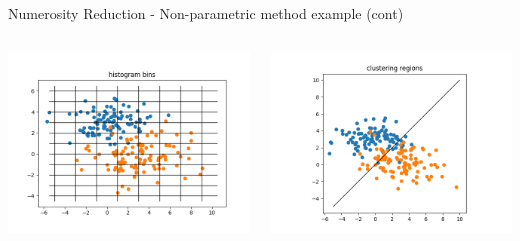 \begin{frame}{Numerosity Reduction - Non-parametric method example (cont)}
    \begin{columns}
    \begin{column}{0.5\textwidth}
         \begin{center}
            \includegraphics[width=1.0\textwidth]{assets/histogram_bins.png}
        \end{center}
    \end{column}
    \begin{column}{0.5\textwidth}
        \begin{center}
            \includegraphics[width=1.0\textwidth]{assets/clustering_regions.png}
        \end{center}
    \end{column}
    \end{columns}
\end{frame}

